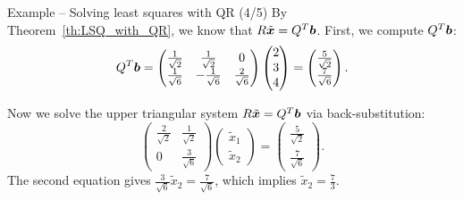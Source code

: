 \documentclass[aspectratio=169]{beamer}\usepackage[]{graphicx}\usepackage[]{xcolor}
\begin{document}
\begin{frame}{Example -- Solving least squares with QR (4/5)}
By Theorem~\ref{th:LSQ_with_QR}, we know that $R\tilde{\bm{x}} = Q^T\bm{b}$. First, we compute $Q^T\bm{b}$:
\[
Q^T\bm{b} = \begin{pmatrix} \frac{1}{\sqrt{2}} & \frac{1}{\sqrt{2}} & 0 \\ \frac{1}{\sqrt{6}} & -\frac{1}{\sqrt{6}} & \frac{2}{\sqrt{6}} \end{pmatrix} \begin{pmatrix} 2 \\ 3 \\ 4 \end{pmatrix} = \begin{pmatrix} \frac{5}{\sqrt{2}} \\ \frac{7}{\sqrt{6}} \end{pmatrix}.
\]

\vfill

Now we solve the upper triangular system $R\tilde{\bm{x}} = Q^T\bm{b}$ via back-substitution:
\[
\begin{pmatrix} \frac{2}{\sqrt{2}} & \frac{1}{\sqrt{2}} \\ 0 & \frac{3}{\sqrt{6}} \end{pmatrix} \begin{pmatrix} \tilde x_1 \\ \tilde x_2 \end{pmatrix} = \begin{pmatrix} \frac{5}{\sqrt{2}} \\ \frac{7}{\sqrt{6}} \end{pmatrix}.
\]
The second equation gives $\frac{3}{\sqrt{6}}\tilde x_2 = \frac{7}{\sqrt{6}}$, which implies $\tilde x_2 = \frac{7}{3}$.
\end{frame}
\end{document}
